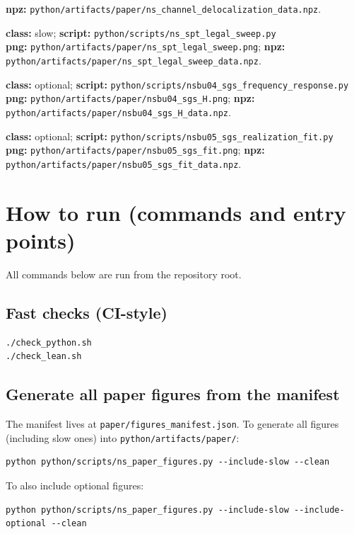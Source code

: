 \documentclass[11pt]{article}
\begin{document}
{\begin{description}
  \textbf{npz:} \nolinkurl{python/artifacts/paper/ns_channel_delocalization_data.npz}.
\item[\texttt{fig\_ns\_spt\_legal\_sweep}] \textbf{class:} slow;
  \textbf{script:} \nolinkurl{python/scripts/ns_spt_legal_sweep.py}\\
  \textbf{png:} \nolinkurl{python/artifacts/paper/ns_spt_legal_sweep.png};
  \textbf{npz:} \nolinkurl{python/artifacts/paper/ns_spt_legal_sweep_data.npz}.
\item[\texttt{fig\_nsbu04\_sgs\_H}] \textbf{class:} optional;
  \textbf{script:} \nolinkurl{python/scripts/nsbu04_sgs_frequency_response.py}\\
  \textbf{png:} \nolinkurl{python/artifacts/paper/nsbu04_sgs_H.png};
  \textbf{npz:} \nolinkurl{python/artifacts/paper/nsbu04_sgs_H_data.npz}.
\item[\texttt{fig\_nsbu05\_sgs\_fit}] \textbf{class:} optional;
  \textbf{script:} \nolinkurl{python/scripts/nsbu05_sgs_realization_fit.py}\\
  \textbf{png:} \nolinkurl{python/artifacts/paper/nsbu05_sgs_fit.png};
  \textbf{npz:} \nolinkurl{python/artifacts/paper/nsbu05_sgs_fit_data.npz}.
\end{description}
}
  \section{How to run (commands and entry points)}\label{app:how-to-run}

All commands below are run from the repository root.

\subsection{Fast checks (CI-style)}
\begin{verbatim}
./check_python.sh
./check_lean.sh
\end{verbatim}

\subsection{Generate all paper figures from the manifest}
The manifest lives at \nolinkurl{paper/figures_manifest.json}.
To generate all figures (including slow ones) into \texttt{python/artifacts/paper/}:
\begin{verbatim}
python python/scripts/ns_paper_figures.py --include-slow --clean
\end{verbatim}
To also include optional figures:
{\small
\begin{verbatim}
python python/scripts/ns_paper_figures.py --include-slow --include-optional --clean
\end{verbatim}
}
\end{document}
